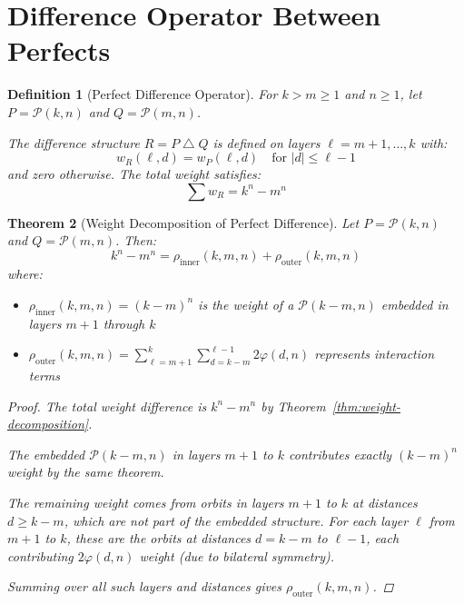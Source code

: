 \documentclass[11pt]{article}
\DeclareMathOperator{\diffop}{\triangle}
\newcommand{\diff}{\mathbin{\diffop}}
\newcommand{\perfect}{\mathcal{P}}
\newtheorem{definition}{Definition}[section]
\newtheorem{theorem}[definition]{Theorem}
\begin{document}

\section{Difference Operator Between Perfects}\label{sec:difference}

\begin{definition}[Perfect Difference Operator]\label{def:perfect-diff}
For $k > m \geq 1$ and $n \geq 1$, let $P = \perfect(k,n)$ and $Q = \perfect(m,n)$. 

The difference structure $R = P \diff Q$ is defined on layers $\ell = m+1, \ldots, k$ with:
\[
w_R(\ell,d) = w_P(\ell,d) \quad \text{for } |d| \leq \ell-1
\]
and zero otherwise. The total weight satisfies:
\[
\sum w_R = k^n - m^n
\]
\end{definition}

\begin{theorem}[Weight Decomposition of Perfect Difference]\label{thm:weight-decomposition-diff}
Let $P = \perfect(k,n)$ and $Q = \perfect(m,n)$. Then:
\[
k^n - m^n = \rho_{\text{inner}}(k,m,n) + \rho_{\text{outer}}(k,m,n)
\]
where:
\begin{itemize}
\item $\rho_{\text{inner}}(k,m,n) = (k-m)^n$ is the weight of a $\perfect(k-m,n)$ embedded in layers $m+1$ through $k$
\item $\rho_{\text{outer}}(k,m,n) = \sum_{\ell=m+1}^k \sum_{d=k-m}^{\ell-1} 2\varphi(d,n)$ represents interaction terms
\end{itemize}
\begin{proof}
The total weight difference is $k^n - m^n$ by Theorem~\ref{thm:weight-decomposition}. 

The embedded $\perfect(k-m,n)$ in layers $m+1$ to $k$ contributes exactly $(k-m)^n$ weight by the same theorem.

The remaining weight comes from orbits in layers $m+1$ to $k$ at distances $d \geq k-m$, which are not part of the embedded structure. For each layer $\ell$ from $m+1$ to $k$, these are the orbits at distances $d = k-m$ to $\ell-1$, each contributing $2\varphi(d,n)$ weight (due to bilateral symmetry).

Summing over all such layers and distances gives $\rho_{\text{outer}}(k,m,n)$.
\end{proof}
\end{theorem}
\end{document}
